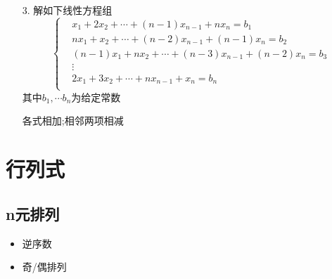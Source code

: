 \begin{itemize}
    \item[3.] 解如下线性方程组
    \begin{equation}
    \nonumber
        \left\{
        \begin{aligned}
            &x_1 +2x_2 +\cdots +(n-1)x_{n-1} +nx_{n} =b_1\\
            &nx_1 +x_2 +\cdots +(n-2)x_{n-1} +(n-1)x_{n} =b_2\\
            &(n-1)x_1 +nx_2 +\cdots +(n-3)x_{n-1} +(n-2)x_{n} =b_3\\
            &\vdots\\
            &2x_1 +3x_2 +\cdots +nx_{n-1} +x_{n} =b_n\\
        \end{aligned}
        \right.
    \end{equation} 
    其中$b_1,\cdots b_n$为给定常数
	\begin{solution}
	各式相加;相邻两项相减
	\end{solution}
    \vspace{2cm}
\end{itemize}

\chapter{行列式}
\section{n元排列}
\begin{itemize}
    \item 逆序数
    \item 奇/偶排列
\end{itemize}

